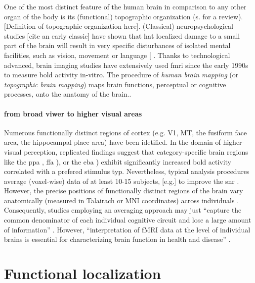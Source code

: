 
%
One of the most distinct feature of the human brain in comparison to any other
organ of the body is its (functional) topographic organization (s.
\citep{debeck2008interpreting} for a review).
%
[Definition of topographic organization here].
%
(Classical) neuropsychological studies [cite an early classic] have shown that
hat localized damage to a small part of the brain will result in very speciﬁc
disturbances of isolated mental facilities, such as vision, movement or language
[\citep{rorden2004using} \citep{eickhoff2018topographic}.
%
Thanks to technological advanced, brain imaging studies have extensively used
\ac{fmri} since the early 1990s to measure \ac{bold} activity in-vitro.
%
The procedure of \textit{human brain mapping} (or \textit{topographic brain
mapping}) maps brain functions, perceptual or cognitive processes, onto the
anatomy of the brain..

\paragraph{from broad viwer to higher visual areas}
%
Numerous functionally distinct regions of cortex (e.g. V1, MT, the fusiform face
area, the hippocampal place area) have been idetified.
In the domain of higher-visual perception, replicated findings suggest that
category-specific brain regions like the \ac{ppa} \citep{epstein1998ppa},
\ac{ffa} \citep{kanwisher1997ffa}), or the \ac{eba} \citep{downing2001bodyarea})
exhibit significantly increased \ac{bold} activity correlated with a prefered stimulus typ.
%
Nevertheless, typical analysis procedures average (voxel-wise) data of at least
10-15 subjects, [e.g.] to improve the \ac{snr}
%
.
%
However, the precise positions of functionally distinct regions of the brain
vary anatomically (measured in Talairach or MNI coordinates) across individuals
\citep{saxe2006divide}.
%
Consequently, studies employing an averaging approach may just ``capture the
common denominator of each individual cognitive circuit and lose a large amount
of information'' \citep{pinel2007fast}.
%
However, ``interpretation of fMRI data at the level of individual brains is
essential for characterizing brain function in health and disease''
\citep{dubois2016building}.
%



\section{Functional localization}


